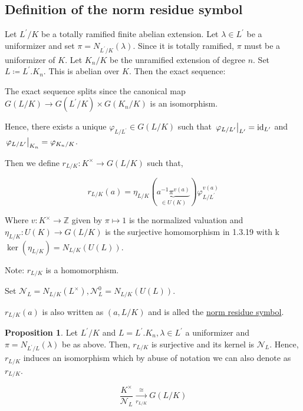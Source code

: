 \documentclass{article}
\theoremstyle{definition}
\numberwithin{theorem}{subsection}
\newtheorem{proposition}[theorem]{Proposition}
\begin{document}
    \subsection*{Definition of the norm residue symbol}

    Let \(L^{\prime} / K\) be a totally ramified finite abelian extension. Let \(\lambda\in L^{\prime}\) be a uniformizer and set \(\pi = N_{L^{\prime} / K}(\lambda)\). Since it is totally ramified, \(\pi\) must be a uniformizer of \(K\). Let \(K_n / K\) be the unramified extension of degree \(n\). Set \(L \coloneqq L^{\prime} . K_n\). This is abelian over \(K\). Then the exact sequence:
    
    \begin{center}
    \end{center}

    The exact sequence splits since the canonical map \(G(L / K) \to G(L^{\prime} / K) \times G(K_n / K)\) is an isomorphism.

    Hence, there exists a unique \(\varphi_{L / L^{\prime}} \in G(L / K)\) such that \(\eval{\varphi_{L / L^{\prime}}}_{L^{\prime}} = \operatorname{id}_{L^{\prime}}\) and \(\eval{\varphi_{L / L^{\prime}}}_{K_n} = \varphi_{K_n / K}\).
    
    Then we define \(r_{L / K}: K^\times \to G(L / K)\) such that,

    \[
        r_{L / K}(a) = \eta_{L / K} \left( \underbrace{a ^{-1} \pi^{v(a)}}_{\in U(K)}  \right) \varphi_{L / L^{\prime}}^{v(a)} 
    \]

    Where \(v: K^\times \to \mathbb{Z}\) given by \(\pi \mapsto 1\) is the normalized valuation and \(\eta_{L / K} : U(K) \to G(L / K)\) is the surjective homomorphism in 1.3.19 with k\(\ker(\eta_{L / K}) = N_{L / K}(U(L))\).  

    Note: \(r_{L / K}\) is a homomorphism.

    Set \(\mathcal{N}_L = N_{L / K}(L^\times), \mathcal{N}_L^0 = N_{L / K}(U(L))\).
    
    \(r_{L / K}(a)\) is also written as \((a, L / K)\) and is alled the \underline{norm residue symbol}.

    \begin{proposition}
        Let \(L ^{\prime} / K\) and \(L = L^{\prime} . K_n, \lambda \in L^{\prime}\) a uniformizer and \(\pi = N_{L^{\prime} / L}(\lambda)\) be as above. Then, \(r_{L / K}\) is surjective and its kernel is \(\mathcal{N}_L\). Hence, \(r_{L / K}\) induces an isomorphism which by abuse of notation we can also denote as \(r_{L / K}\).

        \[
            \frac{K^\times}{\mathcal{N}_L} \xrightarrow[r_{L / K}]{\cong} G(L / K)
        \]
    \end{proposition}
\end{document}
